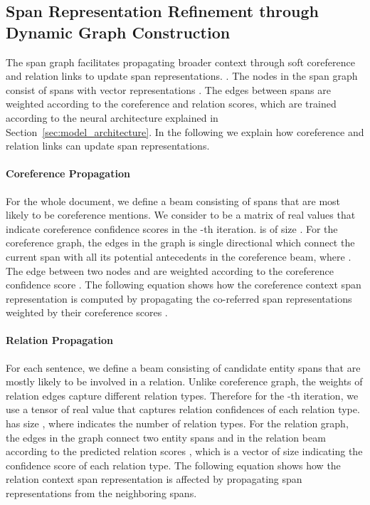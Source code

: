  

\subsection{Span Representation Refinement through Dynamic Graph Construction}
 The  span graph facilitates propagating broader context through soft coreference and relation links to update span representations.  .
 The nodes in the span graph consist of spans  with vector representations . The edges between spans are weighted according to the coreference and relation scores, which are trained according to the neural architecture explained in Section~\ref{sec:model_architecture}. In the following we explain how coreference and relation links can update span representations.  
 
 
 \paragraph{Coreference Propagation} For the whole document, we define a beam  consisting of  spans that are most likely to be coreference mentions.  We consider  to be a matrix of real values that indicate coreference confidence scores in the -th iteration.  is of size . For the coreference graph,  the edges in the graph is single directional which connect the current  span  with all its potential antecedents  in the coreference beam, where .  The edge between two nodes  and  are weighted according to the coreference confidence score . 
The following equation shows how the coreference context span representation  is computed by propagating the co-referred span representations  weighted by their coreference scores  . 

 

\paragraph{Relation Propagation}  For each sentence, we define a beam  consisting of  candidate entity spans that are mostly likely to be involved in a relation.  Unlike coreference graph, the weights of relation edges capture different relation types.  Therefore for the -th iteration, we use a tensor  of real value that captures relation confidences of each relation type.  has size , where  indicates the number of relation types.
For the relation graph,  the edges in the graph connect two entity spans  and  in the relation beam according to  the predicted relation scores , which is a vector of size  indicating the confidence score of each relation type. 
The following equation shows how the relation context span representation   is affected by propagating span representations from the neighboring spans. 


